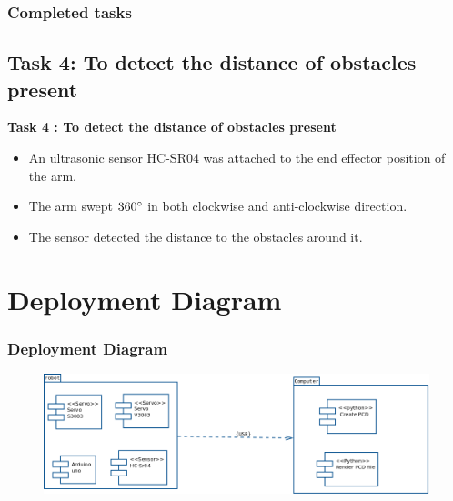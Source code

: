 \documentclass{beamer}
\begin{document}
\begin{frame}[fragile]
\frametitle{Completed tasks}
\subsection{Task 4: To detect the distance of obstacles present}
\textbf{Task 4 : To detect the distance of obstacles present}
\begin{itemize}
\item An ultrasonic sensor  HC-SR04 was attached to the end effector position of the arm.
\item  The arm swept $360\degree$ in both clockwise and anti-clockwise direction.
\item The sensor detected the distance to the obstacles around it.
\end{itemize}
\end{frame}


\section{Deployment Diagram}
\begin{frame}
\frametitle{Deployment Diagram}
\begin{figure}
\includegraphics[scale=0.23]{deployment_digaram.png}
\end{figure}

\end{frame}
\end{document}
